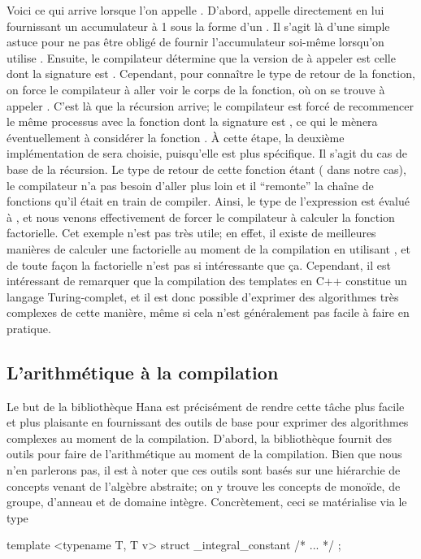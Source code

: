 Voici ce qui arrive lorsque l'on appelle . D'abord,
 appelle directement  en lui fournissant un
accumulateur à 1 sous la forme d'un . Il s'agit là d'une simple
astuce pour ne pas être obligé de fournir l'accumulateur soi-même lorsqu'on
utilise . Ensuite, le compilateur détermine que la version de
 à appeler est celle dont la signature est . Cependant, pour connaître le type de retour de
la fonction, on force le compilateur à aller voir le corps de la fonction, où
on se trouve à appeler . C'est
là que la récursion arrive; le compilateur est forcé de recommencer le même
processus avec la fonction dont la signature est , ce qui le mènera éventuellement à considérer la fonction
. À cette étape, la deuxième
implémentation de  sera choisie, puisqu'elle est plus
spécifique. Il s'agit du cas de base de la récursion. Le type de retour de
cette fonction étant  ( dans notre
cas), le compilateur n'a pas besoin d'aller plus loin et il ``remonte'' la
chaîne de fonctions qu'il était en train de compiler. Ainsi, le type de
l'expression  est évalué à ,
et nous venons effectivement de forcer le compilateur à calculer la fonction
factorielle. Cet exemple n'est pas très utile; en effet, il existe de
meilleures manières de calculer une factorielle au moment de la compilation en
utilisant , et de toute façon la factorielle n'est pas si
intéressante que ça. Cependant, il est intéressant de remarquer que la
compilation des templates en C++ constitue un langage Turing-complet, et il
est donc possible d'exprimer des algorithmes très complexes de cette manière,
même si cela n'est généralement pas facile à faire en pratique.


\subsection{L'arithmétique à la compilation}
Le but de la bibliothèque Hana est précisément de rendre cette tâche plus
facile et plus plaisante en fournissant des outils de base pour exprimer des
algorithmes complexes au moment de la compilation. D'abord, la bibliothèque
fournit des outils pour faire de l'arithmétique au moment de la compilation.
Bien que nous n'en parlerons pas, il est à noter que ces outils sont basés
sur une hiérarchie de concepts venant de l'algèbre abstraite; on y trouve les
concepts de monoïde, de groupe, d'anneau et de domaine intègre. Concrètement,
ceci se matérialise via le type
\begin{cpp}
    template <typename T, T v>
    struct _integral_constant { /* ... */ };
\end{cpp}

